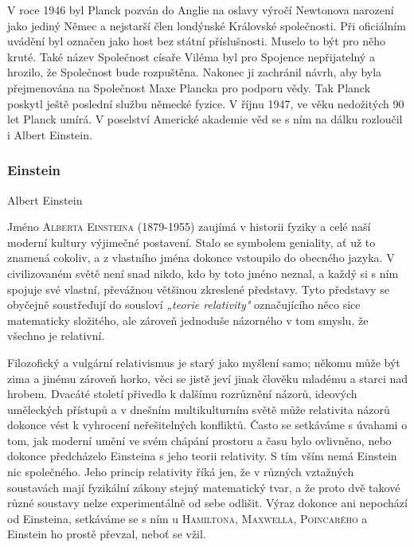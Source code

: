         V roce 1946 byl Planck pozván do Anglie na oslavy výročí Newtonova narození jako jediný
        Němec a nejstarší člen londýnské Královské společnosti. Při oficiálním uvádění byl označen
        jako host bez státní příslušnosti. Muselo to být pro něho kruté. Také název Společnost
        císaře Viléma byl pro Spojence nepřijatelný a hrozilo, že Společnost bude rozpuštěna.
        Nakonec ji zachránil návrh, aby byla přejmenována na Společnost Maxe Plancka pro podporu
        vědy. Tak Planck poskytl ještě poslední službu německé fyzice. V říjnu 1947, ve věku
        nedožitých 90 let Planck umírá. V poselství Americké akademie věd se s ním na dálku
        rozloučil i Albert Einstein.

      \subsubsection{Einstein}
        \epigraph{\emph{}}{Albert Einstein}

        Jméno \textsc{Alberta Einsteina} (1879-1955) zaujímá v historii fyziky a celé naší moderní
        kultury výjimečné postavení. Stalo se symbolem geniality, ať už to znamená cokoliv, a z
        vlastního jména dokonce vstoupilo do obecného jazyka. V civilizovaném světě není snad nikdo,
        kdo by toto jméno neznal, a každý si s ním spojuje své vlastní, převážnou většinou zkreslené
        představy. Tyto představy se obyčejně soustřeďují do sousloví \emph{„teorie relativity"}
        označujícího něco sice matematicky složitého, ale zároveň jednoduše názorného v tom smyslu,
        že všechno je relativní.

        Filozofický a vulgární relativismus je starý jako myšlení samo; někomu může být zima a
        jinému zároveň horko, věci se jistě jeví jinak člověku mladému a starci nad hrobem. Dvacáté
        století přivedlo k dalšímu rozrůznění názorů, ideových uměleckých přístupů a v dnešním
        multikulturním světě může relativita názorů dokonce vést k vyhrocení neřešitelných
        konfliktů. Často se setkáváme s úvahami o tom, jak moderní umění ve svém chápání prostoru a
        času bylo ovlivněno, nebo dokonce předcházelo Einsteina s jeho teorii relativity. S tím vším
        nemá Einstein nic společného. Jeho princip relativity říká jen, že v různých vztažných
        soustavách mají fyzikální zákony stejný matematický tvar, a že proto dvě takové různé
        soustavy nelze experimentálně od sebe odlišit. Výraz  dokonce ani
        nepochází od Einsteina, setkáváme se s ním u \textsc{Hamiltona}, \textsc{Maxwella},
        \textsc{Poincarého} a Einstein ho prostě převzal, neboť se vžil.

